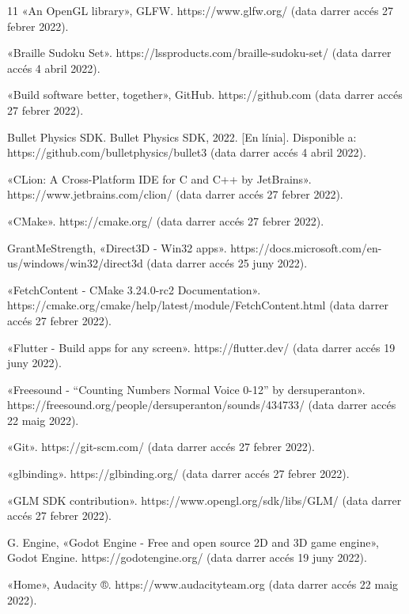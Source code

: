 ﻿\documentclass[10pt,a4paper,twocolumn,twoside]{article}
\begin{document}
\begin{thebibliography}{11}
    «An OpenGL library», GLFW. https://www.glfw.org/ (data darrer accés 27 febrer 2022).

    «Braille Sudoku Set». https://lssproducts.com/braille-sudoku-set/ (data darrer accés 4 abril 2022).

    «Build software better, together», GitHub. https://github.com (data darrer accés 27 febrer 2022).

    Bullet Physics SDK. Bullet Physics SDK, 2022. [En línia]. Disponible a: https://github.com/bulletphysics/bullet3 (data darrer accés 4 abril 2022).

    «CLion: A Cross-Platform IDE for C and C++ by JetBrains». https://www.jetbrains.com/clion/ (data darrer accés 27 febrer 2022).

    «CMake». https://cmake.org/ (data darrer accés 27 febrer 2022).

    GrantMeStrength, «Direct3D - Win32 apps». https://docs.microsoft.com/en-us/windows/win32/direct3d (data darrer accés 25 juny 2022).

    «FetchContent - CMake 3.24.0-rc2 Documentation». https://cmake.org/cmake/help/latest/module/FetchContent.html (data darrer accés 27 febrer 2022).

    «Flutter - Build apps for any screen». https://flutter.dev/ (data darrer accés 19 juny 2022).

    «Freesound - “Counting Numbers Normal Voice 0-12” by dersuperanton». https://freesound.org/people/dersuperanton/sounds/434733/ (data darrer accés 22 maig 2022).

    «Git». https://git-scm.com/ (data darrer accés 27 febrer 2022).

    «glbinding». https://glbinding.org/ (data darrer accés 27 febrer 2022).

    «GLM SDK contribution». https://www.opengl.org/sdk/libs/GLM/ (data darrer accés 27 febrer 2022).

    G. Engine, «Godot Engine - Free and open source 2D and 3D game engine», Godot Engine. https://godotengine.org/ (data darrer accés 19 juny 2022).

    «Home», Audacity ®. https://www.audacityteam.org (data darrer accés 22 maig 2022).


\end{thebibliography}
\end{document}
